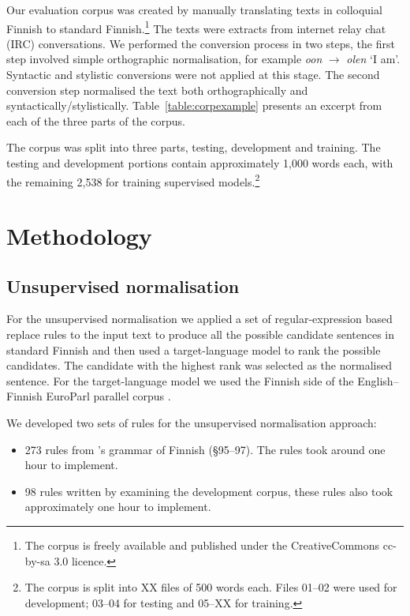 \documentclass[11pt]{article}
\begin{document}
Our evaluation corpus was created by manually translating texts in colloquial Finnish
to standard Finnish.\footnote{The corpus is freely available and published under the 
CreativeCommons {\sc cc-by-sa} 3.0 licence.} The texts were extracts from internet 
relay chat (IRC) conversations. We performed the conversion process in two steps, the first
step involved simple orthographic normalisation, for 
example \emph{oon} $\rightarrow$ \emph{olen} `I am'. Syntactic and stylistic conversions 
were not applied at this stage. The second conversion step normalised the text
both orthographically and syntactically/stylistically. Table~\ref{table:corpexample} presents
an excerpt from each of the three parts of the corpus.

The corpus was split into three parts, testing, development and training. The testing
and development portions contain approximately 1,000 words each, with the remaining 2,538 for training
supervised models.\footnote{The corpus is split into XX files of 500 words each. Files 01--02 
  were used for development; 03--04 for testing and 05--XX for training.}

\section{Methodology}

\subsection{Unsupervised normalisation}

For the unsupervised normalisation we applied a set of regular-expression based 
replace rules to the input text to produce all the possible candidate sentences 
in standard Finnish and then used a target-language model to rank the possible 
candidates. The candidate with the highest rank was selected as the normalised sentence.
For the target-language model we used the Finnish side of the English--Finnish EuroParl
parallel corpus \cite{koehn2005}.

We developed two sets of rules for the unsupervised normalisation approach:

\begin{itemize}
  \item 273 rules from 's grammar of Finnish (\S95--97). The 
    rules took around one hour to implement.
  \item 98 rules written by examining the development corpus, these rules also
    took approximately one hour to implement.
\end{itemize}
\end{document}
